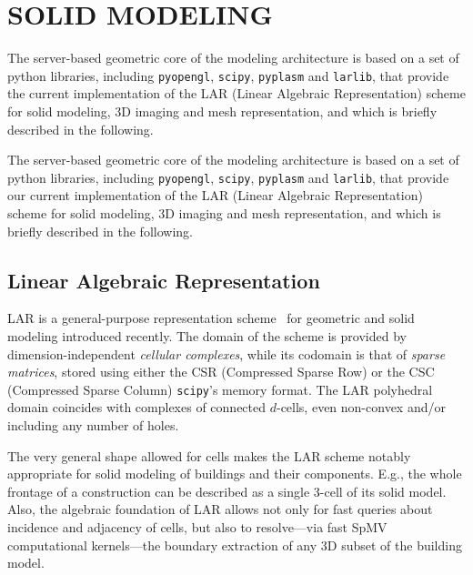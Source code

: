 \vspace{-4mm}
\section{\uppercase{Solid Modeling}}
\label{sec:modeling}
\vspace{-2mm}

\ifreview

\noindent
The server-based geometric core of the modeling architecture is based on a set of python libraries, including \texttt{pyopengl}, \texttt{scipy}, \texttt{pyplasm} and \texttt{larlib}, that provide the current implementation of the LAR (Linear Algebraic Representation) scheme for solid modeling, 3D imaging and mesh representation, and which is briefly described in the following.
\else

The server-based geometric core of the modeling architecture is based on a set of python libraries, including \texttt{pyopengl}, \texttt{scipy}, \texttt{pyplasm} and \texttt{larlib}, that provide our current implementation of the LAR (Linear Algebraic Representation) scheme for solid modeling, 3D imaging and mesh representation, and which is briefly described in the following.

\fi

\vspace{-3mm}\subsection{Linear Algebraic Representation}\vspace{-3mm}

LAR is a general-purpose representation scheme~\cite{Dicarlo:2014:TNL:2543138.2543294} for geometric and solid modeling introduced recently. The domain of the scheme is provided by dimension-independent \emph{cellular complexes}, while its codomain is that of \emph{sparse matrices}, stored using either the CSR (Compressed Sparse Row) or the CSC (Compressed Sparse Column) \texttt{scipy}'s memory format. The LAR polyhedral domain coincides with complexes of connected $d$-cells, even non-convex and/or including any number of holes. 

The very general shape allowed for cells makes the LAR scheme notably appropriate for solid modeling of buildings and their components. E.g., the whole frontage of a construction can be described as a single 3-cell of its solid model. Also, the algebraic foundation of LAR allows not only for fast queries about incidence and adjacency of cells, but also to resolve---via fast SpMV computational kernels---the boundary extraction of any 3D subset of the building model. 

